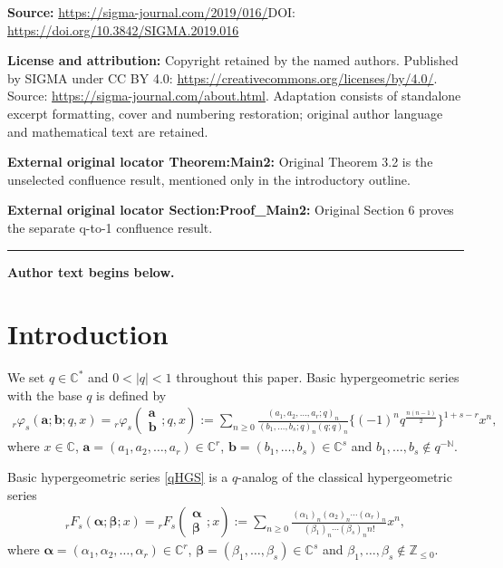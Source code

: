 \documentclass[11pt]{article}
\numberwithin{equation}{section}
\begin{document}
\noindent\textbf{Source:} \url{https://sigma-journal.com/2019/016/}\quad DOI: \url{https://doi.org/10.3842/SIGMA.2019.016}\par
\noindent\textbf{License and attribution:} Copyright retained by the named authors. Published by SIGMA under CC BY 4.0: \url{https://creativecommons.org/licenses/by/4.0/}. Source: \url{https://sigma-journal.com/about.html}. Adaptation consists of standalone excerpt formatting, cover and numbering restoration; original author language and mathematical text are retained.\par
\noindent\textbf{External original locator Theorem:Main2:} Original Theorem 3.2 is the unselected confluence result, mentioned only in the introductory outline.\par
\noindent\textbf{External original locator Section:Proof\_Main2:} Original Section 6 proves the separate q-to-1 confluence result.\par
\medskip\hrule\medskip\noindent\textbf{Author text begins below.}\par
\setcounter{section}{0}
\setcounter{subsection}{0}
\setcounter{subsubsection}{0}
\setcounter{Theorem}{0}
\setcounter{equation}{0}
\section{Introduction}
We set $q\in\mathbb{C}^*$ and $0<|q|<1$ throughout this paper. Basic hypergeometric series with the base $q$ is defined by
\begin{gather}\label{qHGS}
{}_r\varphi_s\left(\bm{a};\bm{b};q,x\right)=
{}_r\varphi_s\left(\begin{matrix}\bm{a}\\ \bm{b}\end{matrix};q,x\right)
:=\sum_{n\ge0} \frac{(a_1,a_2,\ldots,a_r;q)_n}{(b_1,\ldots,b_s;q)_n(q;q)_n}\big\{(-1)^nq^{\frac{n(n-1)}{2}}\big\}^{1+s-r}x^n,
\end{gather}
where $x\in\mathbb{C}$, $\bm{a}=(a_1,a_2,\ldots,a_r)\in\mathbb{C}^r$, $\bm{b}=(b_1,\ldots,b_s)\in\mathbb{C}^s$ and $b_1,\ldots,b_s\notin q^{-\mathbb{N}}$.

Basic hypergeometric series \eqref{qHGS} is a $q$-analog of the classical hypergeometric series
\begin{gather}\label{HGS}
{}_rF_s\left(\bm{\alpha};\bm{\beta};x\right)=
{}_rF_s\left(\begin{matrix}
\bm{\alpha}\\
\bm{\beta}
\end{matrix};x\right)
:=\sum_{n\ge0}\frac{(\alpha_1)_n(\alpha_2)_n\cdots(\alpha_r)_n}{(\beta_1)_n\cdots(\beta_s)_nn!}x^n,
\end{gather}
where $\bm{\alpha}=(\alpha_1,\alpha_2,\ldots,\alpha_r)\in\mathbb{C}^r$, $\bm{\beta}=(\beta_1,\ldots,\beta_s)\in\mathbb{C}^s$ and $\beta_1,\ldots,\beta_s\notin \mathbb{Z}_{\le0}$.
\end{document}
